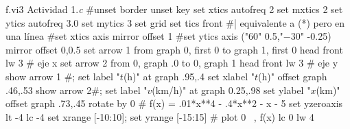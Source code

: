 \begin{plot}{1.1}{f.vi3}
  {Actividad 1.\textit{c}}
  #unset border
  unset key
  set xtics autofreq 2
  set mxtics 2
  set ytics autofreq 3.0
  set mytics 3
  set grid
  set tics front    #| equivalente a (*) pero en una línea
  #set xtics axis mirror offset 1
  #set ytics axis ("$60$" 0.5,"$-30$" -0.25) mirror offset 0,0.5
  set arrow 1 from graph 0, first 0 to graph 1, first 0 head front lw 3 # eje x
  set arrow 2 from 0, graph .0 to 0, graph 1 head front lw 3		# eje y 
  show arrow 1 #; set label "$t$(h)" at graph .95,.4
  set xlabel "$t$(h)" offset  graph .46,.53
  show arrow 2#; set label "$v$(km/h)" at graph 0.25,.98 
  set ylabel "$x$(km)" offset graph .73,.45 rotate by 0
  #
  f(x) = .01*x**4 - .4*x**2 - x - 5
  set yzeroaxis lt -4 lc -4
  set xrange [-10:10]; set yrange [-15:15]
  #
  plot  0 \
  , f(x) lc 0 lw 4 \
\end{plot}

